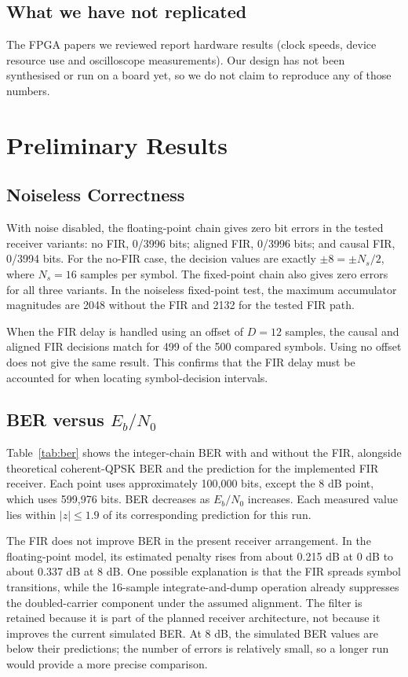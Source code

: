 \documentclass[10pt,twocolumn,letterpaper]{article}
\begin{document}
\subsection{What we have not replicated}
The FPGA papers we reviewed report hardware results (clock speeds, device
resource use and oscilloscope measurements). Our design has not been
synthesised or run on a board yet, so we do not claim to reproduce any of
those numbers.

\section{Preliminary Results}

\subsection{Noiseless Correctness}
With noise disabled, the floating-point chain gives zero bit errors in the tested receiver variants: no FIR, 0/3996 bits; aligned FIR, 0/3996 bits; and causal FIR, 0/3994 bits. For the no-FIR case, the decision values are exactly $\pm 8=\pm N_s/2$, where $N_s=16$ samples per symbol. The fixed-point chain also gives zero errors for all three variants. In the noiseless fixed-point test, the maximum accumulator magnitudes are 2048 without the FIR and 2132 for the tested FIR path.

When the FIR delay is handled using an offset of $D=12$ samples, the causal and aligned FIR decisions match for 499 of the 500 compared symbols. Using no offset does not give the same result. This confirms that the FIR delay must be accounted for when locating symbol-decision intervals.

\subsection{BER versus $E_b/N_0$}
Table~\ref{tab:ber} shows the integer-chain BER with and without the FIR, alongside theoretical coherent-QPSK BER and the prediction for the implemented FIR receiver. Each point uses approximately 100,000 bits, except the 8 dB point, which uses 599,976 bits. BER decreases as $E_b/N_0$ increases. Each measured value lies within $|z|\leq 1.9$ of its corresponding prediction for this run.

The FIR does not improve BER in the present receiver arrangement. In the floating-point model, its estimated penalty rises from about 0.215 dB at 0 dB to about 0.337 dB at 8 dB. One possible explanation is that the FIR spreads symbol transitions, while the 16-sample integrate-and-dump operation already suppresses the doubled-carrier component under the assumed alignment. The filter is retained because it is part of the planned receiver architecture, not because it improves the current simulated BER. At 8 dB, the simulated BER values are below their predictions; the number of errors is relatively small, so a longer run would provide a more precise comparison.
\end{document}
